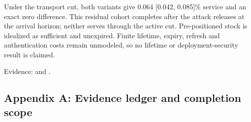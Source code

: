 \documentclass[a4paper,11pt]{article}
\begin{document}
Under the transport cut, both variants give 0.064 {[}0.042, 0.085{]}\% service and an exact zero difference. This residual cohort completes after the attack releases at the arrival horizon; neither serves through the active cut. Pre-positioned stock is idealized as sufficient and unexpired. Finite lifetime, expiry, refresh and authentication costs remain unmodeled, so no lifetime or deployment-security result is claimed.

Evidence:  and .

\clearpage\subsection{Appendix A: Evidence ledger and completion scope}\label{appendix-a-evidence-ledger-and-completion-scope}
\end{document}
